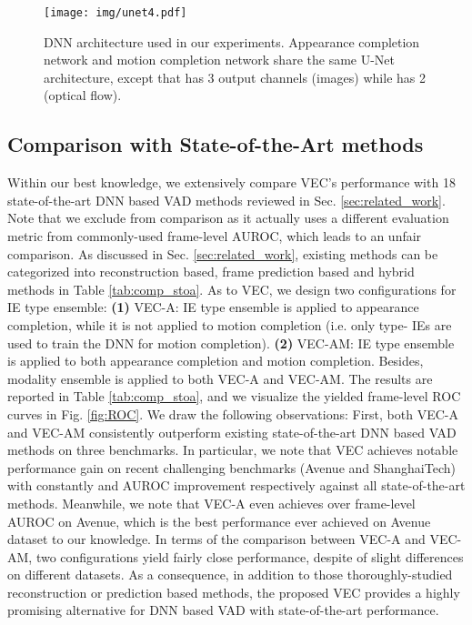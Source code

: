 \documentclass[sigconf]{acmart}
\begin{document}
\begin{figure}
	\centering
	\texttt{[image: img/unet4.pdf]}
	\caption{DNN architecture used in our experiments. Appearance completion network  and motion completion network  share the same U-Net architecture, except that  has 3 output channels (images) while  has 2 (optical flow).}
	\label{fig:U-Net}
\end{figure}

\subsection{Comparison with State-of-the-Art methods}

Within our best knowledge, we extensively compare VEC's performance with 18 state-of-the-art DNN based VAD methods reviewed in Sec. \ref{sec:related_work}. Note that we exclude \cite{ionescu2019object} from comparison as it actually uses a different evaluation metric from commonly-used frame-level AUROC, which leads to an unfair comparison. As discussed in Sec. \ref{sec:related_work}, existing methods can be categorized into reconstruction based, frame prediction based and hybrid methods in Table \ref{tab:comp_stoa}. As to VEC, we design two configurations for IE type ensemble: \textbf{(1)} VEC-A: IE type ensemble is applied to appearance completion, while it is not applied to motion completion (i.e. only type- IEs are used to train the DNN for motion completion). \textbf{(2)} VEC-AM: IE type ensemble is applied to both appearance completion and motion completion. Besides, modality ensemble is applied to both VEC-A and VEC-AM. The results are reported in Table \ref{tab:comp_stoa}, and we visualize the yielded frame-level ROC curves in Fig. \ref{fig:ROC}. We draw the following observations: First, both VEC-A and VEC-AM consistently outperform existing state-of-the-art DNN based VAD methods on three benchmarks. In particular, we note that VEC achieves notable performance gain on recent challenging benchmarks (Avenue and ShanghaiTech) with constantly  and  AUROC improvement respectively against all state-of-the-art methods. Meanwhile, we note that VEC-A even achieves over  frame-level AUROC on Avenue, which is the best performance ever achieved on Avenue dataset to our knowledge. In terms of the comparison between VEC-A and VEC-AM, two configurations yield fairly close performance, despite of slight differences on different datasets. As a consequence, in addition to those thoroughly-studied reconstruction or prediction based methods, the proposed VEC provides a highly promising alternative for DNN based VAD with state-of-the-art performance.
\end{document}
